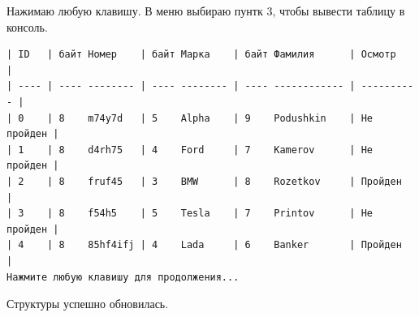 Нажимаю любую клавишу. В меню выбираю пунтк 3, чтобы вывести таблицу в консоль.

\begin{tcolorbox}
\begin{verbatim}
| ID   | байт Номер    | байт Марка    | байт Фамилия      | Осмотр     |
| ---- | ---- -------- | ---- -------- | ---- ------------ | ---------- |
| 0    | 8    m74y7d   | 5    Alpha    | 9    Podushkin    | Не пройден |
| 1    | 8    d4rh75   | 4    Ford     | 7    Kamerov      | Не пройден |
| 2    | 8    fruf45   | 3    BMW      | 8    Rozetkov     | Пройден    |
| 3    | 8    f54h5    | 5    Tesla    | 7    Printov      | Не пройден |
| 4    | 8    85hf4ifj | 4    Lada     | 6    Banker       | Пройден    |
Нажмите любую клавишу для продолжения...   
\end{verbatim}
\end{tcolorbox}

Структуры успешно обновилась.